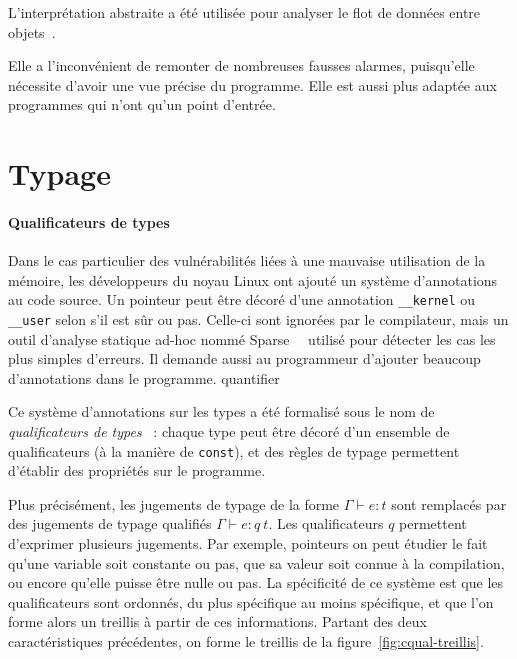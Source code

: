 
L'interprétation abstraite a été utilisée pour analyser le flot de données entre
objets~\cite{liang2012taint}.

Elle a l'inconvénient de remonter de nombreuses fausses alarmes, puisqu'elle
nécessite d'avoir une vue précise du programme. Elle est aussi plus adaptée aux
programmes qui n'ont qu'un point d'entrée.

\section{Typage}

\paragraph{Qualificateurs de types}

Dans le cas particulier des vulnérabilités liées à une mauvaise utilisation de
la mémoire, les développeurs du noyau Linux ont ajouté un système d'annotations
au code source. Un pointeur peut être décoré d'une annotation
\texttt{\_\_kernel} ou \texttt{\_\_user} selon s'il est sûr ou pas. Celle-ci
sont ignorées par le compilateur, mais un outil d'analyse statique ad-hoc nommé
Sparse~~\cite{TorvaldsSparse} %
utilisé pour détecter les cas les plus simples d'erreurs. Il demande aussi au
programmeur d'ajouter beaucoup d'annotations dans le programme. %
quantifier

Ce système d'annotations sur les types a été formalisé sous le nom de
\emph{qualificateurs de types}~\cite{toplas-quals} : chaque type peut être
décoré d'un ensemble de qualificateurs (à la manière de \texttt{const}), et des
règles de typage permettent d'établir des propriétés sur le programme.

Plus précisément, les jugements de typage de la forme $Γ ⊢ e : t$ sont remplacés
par des jugements de typage qualifiés $Γ ⊢ e : q~t$. Les qualificateurs $q$
permettent d'exprimer plusieurs jugements.
Par exemple, pointeurs on peut étudier le fait qu'une variable soit constante ou
pas, que sa valeur soit connue à la compilation, ou encore qu'elle puisse être
nulle ou pas.
La
spécificité de ce système est que les qualificateurs sont ordonnés, du plus
spécifique au moins spécifique, et que l'on forme alors un treillis à partir de
ces informations. Partant des deux caractéristiques précédentes, on forme le
treillis de la figure~\ref{fig:cqual-treillis}.

